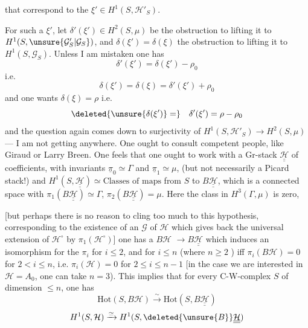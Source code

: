 that  correspond  to the
$\xi'\in H^1(S,\mathcal H'_S)$.

For such a  $\xi'$, let
$\delta'(\xi')\in H^2(S,\mu)$
be the obstruction to lifting it to $H^1(S,\unsure{\mathcal G'_S|\mathcal G_S})$,
and $\delta(\xi')=\delta(\xi)$ the obstruction to lifting it
to $H^1(S,\mathcal G_S)$. Unless I am mistaken one has
\[
\delta'(\xi')=\delta(\xi')-\rho_0
\]
i.e.
\[
\delta(\xi')=\delta(\xi)=\delta'(\xi')+\rho_0
\]
and one wants $\delta(\xi)=\rho$ i.e.
\[
\deleted{\unsure{\delta(\xi')}=}\quad
\delta'(\xi')=\rho-\rho_0
\]
and the question again comes down to  
surjectivity of $H^1(S,\mathcal H'_S)\longrightarrow H^2(S,\mu)$
--- I am not getting anywhere. One ought to
consult competent people, like
Giraud or Larry Breen. One feels that one
ought to work with a Gr-stack $\underline{\underline{\mathcal H}}$
of coefficients, with invariants $\underline{\pi}_0\simeq\Gamma$ and
$\underline{\pi}_1\simeq\mu$,
(but not necessarily a Picard stack!)
 and
$H^1(S,\underline{\underline{\mathcal H}})\simeq\text{Classes of maps}$
from $S$ to $B\underline{\underline{\mathcal H}}$, which is a connected
space with $\pi_1(B\underline{\underline{\mathcal H}})\simeq\Gamma$,
$\pi_2(B\underline{\underline{\mathcal H}})=\mu$.
Here the  class in $H^3(\Gamma,\mu)$ is zero,

[but perhaps there is no reason to
cling too much to this hypothesis,
corresponding to the existence of an  $\mathcal G$ of $\mathcal H$
 
which gives back the universal extension of
$\mathcal H^\circ$ by $\pi_1(\mathcal H^\circ)$] one has a 
$B\mathcal H$  $\longrightarrow B\underline{\underline{\mathcal H}}$
which induces an isomorphism for
the $\pi_i$ for $i\leq2$, and for $i\leq n$
(where $n\geq2$ )
iff $\pi_i(B\mathcal H)=0$ for $2<i\leq n$, i.e.
$\pi_i(\mathcal H)=0$ for $2\leq i\leq n-1$ [in the case
we are interested in $\mathcal H=A_0$, one can
take $n=3$). This implies that for
every C-W-complex $S$ of dimension $\leq n$,
one has 
\[
\mathrm{Hot}(S,B\mathcal H)\xrightarrow{\sim}
\mathrm{Hot}(S,B\underline{\underline{\mathcal H}})
\]
\[
H^1(S,\mathcal H)\xrightarrow{\simeq}
H^1(S,\deleted{\unsure{B}}\underline{\underline{\mathcal H}})
\]

